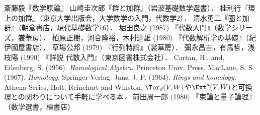 \documentclass[uplatex,dvipdfmx]{jsreport}
\begin{document}
\begin{thebibliography}{9}
    斎藤毅『数学原論』
    山崎圭次郎『群と加群』（岩波基礎数学選書）．
    桂利行『環上の加群』（東京大学出版会，大学数学の入門，代数学2）．
    清水勇二『圏と加群』（朝倉書店，現代基礎数学16）．
    堀田良之 (1987) 『代数入門』（数学シリーズ，裳華房）．
    柏原正樹，河合隆裕，木村達雄 (1980) 『代数解析学の基礎』（紀伊國屋書店）．
    草場公邦 (1979) 『行列特論』（裳華房）．
    彌永昌吉，有馬哲，浅枝陽 (1990) 『詳説 代数入門』（東京図書株式会社）．
    Cartan, H., and, Eilenberg, S. (1956). \textit{Homological Algebra}. Princeton Univ. Press.
    MacLane, S. S. (1967). \textit{Homology}. Springer-Verlag.
    Jans, J. P. (1964). \textit{Rings and homology}. Athena Series, Holt, Reinehart and Winston. $\Tor_d(V,W)$や$\Ext^d(V,W)$と可換環との関わりについて手軽に学べる本．
    前田周一郎 (1980) 『束論と量子論理』（数学選書，槙書店）
\end{thebibliography}
\end{document}
